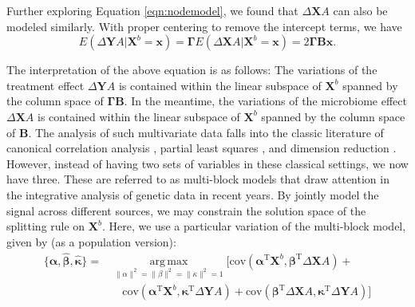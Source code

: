 \documentclass[smallextended]{svjour3}
\DeclareMathOperator*{\argmax}{arg\,max}
\newcommand{\trnp}{^\text{T}}
\begin{document}
Further exploring Equation \eqref{eqn:nodemodel}, we found that $\Delta \bm X A$ can also be modeled similarly. With proper centering to remove the intercept terms, we have
\begin{equation}
    E(\Delta \bm Y A | \bm X^b=\bm x) = \bm \Gamma E(\Delta \bm X A | \bm X^b = \bm x) = 2\bm \Gamma \bm B \bm x. \label{eqn:threesides}
\end{equation}

The interpretation of the above equation is as follows: The variations of the treatment effect $\Delta \bm Y A$ is contained within the linear subspace of $\bm X^b$ spanned by the column space of $\bm \Gamma \bm B$. In the meantime, the variations of the microbiome effect $\Delta \bm X A $ is contained within the linear subspace of $\bm X^b$ spanned by the column space of $\bm B$. The analysis of such multivariate data falls into the classic literature of canonical correlation analysis \citep{hotelling1936relations}, partial least squares \citep{wold2001pls}, and dimension reduction \citep{cook2010envelope}. However, instead of having two sets of variables in these classical settings, we now have three. These are referred to as multi-block models \citep{tenenhaus2011regularized, tenenhaus2017regularized} that draw attention in the integrative analysis of genetic data \citep{meng2016dimension, rohart2017mixomics} in recent years. By jointly model the signal across different sources, we may constrain the solution space of the splitting rule on $\bm X^b$. Here, we use a particular variation of the multi-block model, given by (as a population version):
\begin{align}
\{\bm{\widehat{\alpha}}, \bm{\widehat{\beta}}, \bm{\widehat{\kappa}}\} = & \argmax\limits_{\lVert\alpha\rVert^2 = \lVert\beta\rVert^2 = \lVert\kappa\rVert^2 = 1}
\Big[ \text{cov}( \bm \alpha\trnp \bm{X}^b, \bm \beta \trnp \Delta \bm{X} A ) + \nonumber \\ 
&\quad \text{cov} (\bm \alpha\trnp \bm{X}^b, \bm \kappa \trnp \Delta \bm{Y} A) +\text{cov}(\bm \beta\trnp \Delta \bm{X} A, \bm \kappa\trnp \Delta \bm{Y} A ) \Big] \label{eqn:multiblock}
\end{align}
\end{document}
